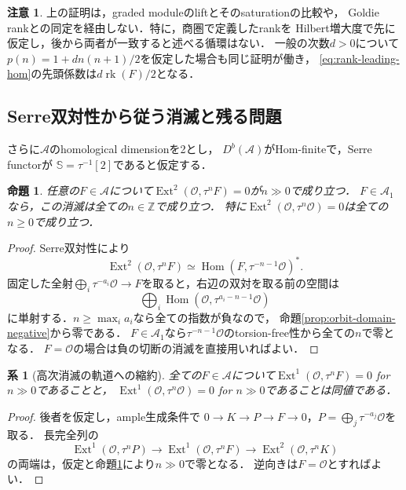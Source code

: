 \documentclass[11pt,a4paper]{ltjsarticle}
\newtheorem{proposition}[theorem]{命題}
\newtheorem{corollary}[theorem]{系}
\theoremstyle{definition}
\newtheorem{remark}[theorem]{注意}
\newcommand{\OO}{\mathcal O}
\renewcommand{\AA}{\mathcal A}
\newcommand{\SSer}{\mathbb S}
\newcommand{\Hom}{\operatorname{Hom}}
\newcommand{\Ext}{\operatorname{Ext}}
\newcommand{\rk}{\operatorname{rk}}
\begin{document}
\begin{remark}
上の証明は，graded moduleのliftとそのsaturationの比較や，
Goldie rankとの同定を経由しない．特に，商圏で定義したrankを
Hilbert増大度で先に仮定し，後から両者が一致すると述べる循環はない．
一般の次数$d>0$について$p(n)=1+dn(n+1)/2$を仮定した場合も同じ証明が働き，
\eqref{eq:rank-leading-hom}の先頭係数は$d\rk(F)/2$となる．
\end{remark}

\subsection{Serre双対性から従う消滅と残る問題}
さらに$\AA$のhomological dimensionを2とし，
$D^b(\AA)$がHom-finiteで，Serre functorが
$\SSer=\tau^{-1}[2]$であると仮定する．

\begin{proposition}\label{prop:rank-ext-two-vanishing}
任意の$F\in\AA$について$\Ext^2(\OO,\tau^nF)=0$が$n\gg0$で成り立つ．
$F\in\AA_1$なら，この消滅は全ての$n\in\mathbb Z$で成り立つ．
特に$\Ext^2(\OO,\tau^n\OO)=0$は全ての$n\geq0$で成り立つ．
\end{proposition}

\begin{proof}
Serre双対性により
\[
 \Ext^2(\OO,\tau^nF)
 \simeq\Hom(F,\tau^{-n-1}\OO)^*.
\]
固定した全射$\bigoplus_i\tau^{-a_i}\OO\to F$を取ると，右辺の双対を取る前の空間は
\[
 \bigoplus_i\Hom(\OO,\tau^{a_i-n-1}\OO)
\]
に単射する．$n\geq\max_i a_i$なら全ての指数が負なので，
命題\ref{prop:orbit-domain-negative}から零である．
$F\in\AA_1$なら$\tau^{-n-1}\OO$のtorsion-free性から全ての$n$で零となる．
$F=\OO$の場合は負の切断の消滅を直接用いればよい．
\end{proof}

\begin{corollary}[高次消滅の軌道への縮約]\label{cor:orbit-vanishing-reduction}
全ての$F\in\AA$について$\Ext^1(\OO,\tau^nF)=0$ for $n\gg0$であることと，
$\Ext^1(\OO,\tau^n\OO)=0$ for $n\gg0$であることは同値である．
\end{corollary}
\begin{proof}
後者を仮定し，ample生成条件で
$0\to K\to P\to F\to0$，$P=\bigoplus_j\tau^{-a_j}\OO$を取る．
長完全列の
\[
 \Ext^1(\OO,\tau^nP)\longrightarrow\Ext^1(\OO,\tau^nF)
 \longrightarrow\Ext^2(\OO,\tau^nK)
\]
の両端は，仮定と命題\ref{prop:rank-ext-two-vanishing}により$n\gg0$で零となる．
逆向きは$F=\OO$とすればよい．
\end{proof}
\end{document}
